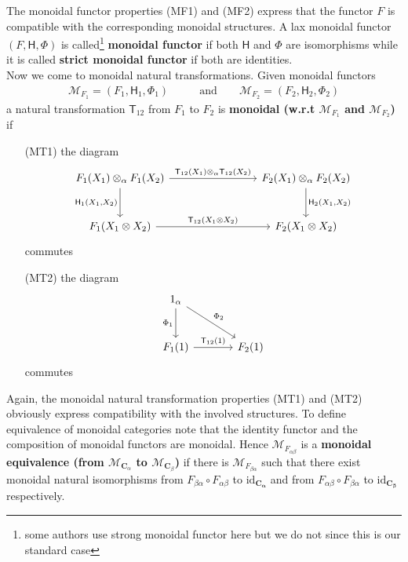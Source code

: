 The monoidal functor properties (MF1) and (MF2) express that the functor $F$ is compatible with the corresponding monoidal structures. A lax monoidal functor $(F,\mathsf{H},\Phi)$ is called\footnote{some authors use strong monoidal functor here but we do not since this is our standard case} \textbf{monoidal functor} if both $\mathsf{H}$ and $\Phi$ are isomorphisms while it is called \textbf{strict monoidal functor} if both are identities.
\\
Now we come to monoidal natural transformations. Given monoidal functors
\begin{align*}
  \mathcal{M}_{F_{1}}
  =
  \left(
    F_{1},
    \mathsf{H}_{1},
    \Phi_{1}
  \right)
  \qquad
  &\text{and}
  \qquad
  \mathcal{M}_{F_{2}}
  =
  \left(
    F_{2},
    \mathsf{H}_{2},
    \Phi_{2}
  \right)
\end{align*}
a natural transformation $\mathsf{T}_{12}$ from $F_{1}$ to $F_{2}$ is \textbf{monoidal (w.r.t $\mathcal{M}_{F_{1}}$ and $\mathcal{M}_{F_{2}}$)} if
\begin{enumerate}
\item[(MT1)]
the diagram
\begin{equation*}
\begin{tikzcd}[row sep=large,column sep=8em]
  F_{1}(X_{1})
  \otimes_{\alpha}
  F_{1}(X_{2})
  \arrow{r}{\mathsf{T}_{12}(X_{1}) \otimes_{\alpha} \mathsf{T}_{12}(X_{2})}
  \arrow[swap]{d}{\mathsf{H}_{1}(X_{1},X_{2})}
  &
  F_{2}(X_{1})
  \otimes_{\alpha}
  F_{2}(X_{2})
  \arrow{d}{\mathsf{H}_{2}(X_{1},X_{2})}
  \\
  F_{1}(X_{1} \otimes X_{2})
  \arrow{r}{\mathsf{T}_{12}(X_{1} \otimes X_{2})}
  &
  F_{2}(X_{1} \otimes X_{2})
\end{tikzcd}
\end{equation*}
commutes
\item[(MT2)]
the diagram
\begin{equation*}
\begin{tikzcd}[sep=large]
  1_{\alpha}
  \arrow{dr}{\Phi_{2}}
  \arrow{d}[swap]{\Phi_{1}}
  &
  \\
  F_{1}(1)
  \arrow{r}{\mathsf{T}_{12}(1)}
  &
  F_{2}(1)
\end{tikzcd}
\end{equation*}
commutes
\end{enumerate}
Again, the monoidal natural transformation properties (MT1) and (MT2) obviously express compatibility with the involved structures. To define equivalence of monoidal categories note that the identity functor and the composition of monoidal functors are monoidal. Hence $\mathcal{M}_{F_{\alpha\beta}}$ is a \textbf{monoidal equivalence (from $\mathcal{M}_{\mathbf{C}_{\alpha}}$ to $\mathcal{M}_{\mathbf{C}_{\beta}}$)} if there is $\mathcal{M}_{F_{\beta\alpha}}$ such that there exist monoidal natural isomorphisms from $F_{\beta\alpha} \circ F_{\alpha\beta}$ to $\mathrm{id}_{\mathbf{C_{\alpha}}}$ and from $F_{\alpha\beta} \circ F_{\beta\alpha} $ to $\mathrm{id}_{\mathbf{C_{\beta}}}$ respectively.
